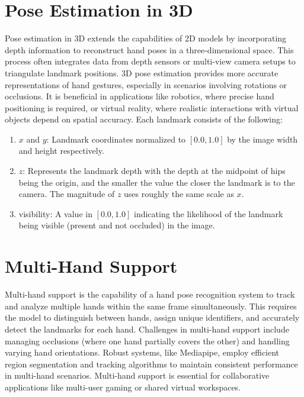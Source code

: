 \section{Pose Estimation in 3D}
Pose estimation in 3D extends the capabilities of 2D models by incorporating depth information to reconstruct hand poses in a three-dimensional space. This process often integrates data from depth sensors or multi-view camera setups to triangulate landmark positions. 3D pose estimation provides more accurate representations of hand gestures, especially in scenarios involving rotations or occlusions. It is beneficial in applications like robotics, where precise hand positioning is required, or virtual reality, where realistic interactions with virtual objects depend on spatial accuracy. Each landmark consists of the following:
\begin{enumerate}
	\item $x$ and $y$: Landmark coordinates normalized to $[0.0, 1.0]$ by the image width and height respectively.
	\item $z$: Represents the landmark depth with the depth at the midpoint of hips being the origin, and the smaller the value the closer the landmark is to the camera. The magnitude of $z$ uses roughly the same scale as $x$.
	\item visibility: A value in $[0.0, 1.0]$ indicating the likelihood of the landmark being visible (present and not occluded) in the image.
\end{enumerate}




\section{Multi-Hand Support}
Multi-hand support is the capability of a hand pose recognition system to track and analyze multiple hands within the same frame simultaneously. This requires the model to distinguish between hands, assign unique identifiers, and accurately detect the landmarks for each hand. Challenges in multi-hand support include managing occlusions (where one hand partially covers the other) and handling varying hand orientations. Robust systems, like Mediapipe, employ efficient region segmentation and tracking algorithms to maintain consistent performance in multi-hand scenarios. Multi-hand support is essential for collaborative applications like multi-user gaming or shared virtual workspaces.